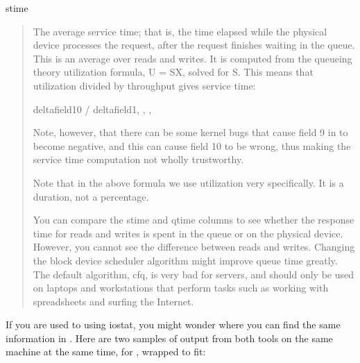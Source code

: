 \documentclass[letterpaper,10pt,english]{sphinxmanual}
\begin{document}
stime
\begin{quote}

The average service time; that is, the time elapsed while the physical device
processes the request, after the request finishes waiting in the queue.  This is
an average over reads and writes.  It is computed from the queueing theory
utilization formula, U = SX, solved for S.  This means that utilization divided
by throughput gives service time:

\begin{sphinxVerbatim}[commandchars=\\\{\}]
delta\PYG{o}{[}field10\PYG{o}{]} / delta\PYG{o}{[}field1, , , \PYG{o}{]}
\end{sphinxVerbatim}

Note, however, that there can be some kernel bugs that cause field 9 in
 to become negative, and this can cause field 10 to be wrong,
thus making the service time computation not wholly trustworthy.

Note that in the above formula we use utilization very specifically. It is a
duration, not a percentage.

You can compare the stime and qtime columns to see whether the response time for
reads and writes is spent in the queue or on the physical device.  However, you
cannot see the difference between reads and writes.  Changing the block device
scheduler algorithm might improve queue time greatly.  The default algorithm,
cfq, is very bad for servers, and should only be used on laptops and
workstations that perform tasks such as working with spreadsheets and surfing
the Internet.
\end{quote}

If you are used to using iostat, you might wonder where you can find the same
information in .  Here are two samples of output from both tools on
the same machine at the same time, for , wrapped to fit:
\end{document}
